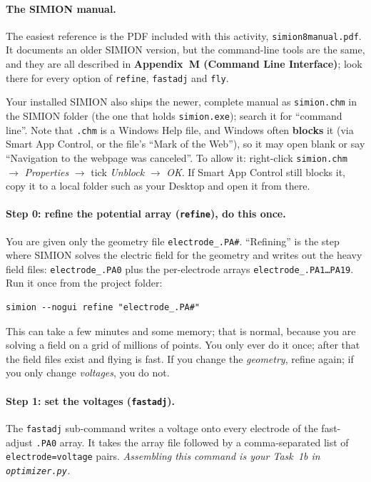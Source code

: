 \documentclass[11pt]{article}
\begin{document}
\paragraph{The SIMION manual.} The easiest reference is the PDF included with
this activity, \texttt{simion8manual.pdf}. It documents an older SIMION version,
but the command-line tools are the same, and they are all described in
\textbf{Appendix~M (Command Line Interface)}; look there for every option of
\texttt{refine}, \texttt{fastadj} and \texttt{fly}.

Your installed SIMION also ships the newer, complete manual as
\texttt{simion.chm} in the SIMION folder (the one that holds
\texttt{simion.exe}); search it for ``command line''. Note that \texttt{.chm} is
a Windows Help file, and Windows often \textbf{blocks} it (via Smart App
Control, or the file's ``Mark of the Web''), so it may open blank or say
``Navigation to the webpage was canceled''. To allow it: right-click
\texttt{simion.chm} $\to$ \emph{Properties} $\to$ tick \emph{Unblock} $\to$
\emph{OK}. If Smart App Control still blocks it, copy it to a local folder such
as your Desktop and open it from there.

\paragraph{Step 0: refine the potential array (\texttt{refine}), do this once.}
You are given only the geometry file \texttt{electrode\_.PA\#}. ``Refining'' is
the step where SIMION solves the electric field for the geometry and writes out
the heavy field files: \texttt{electrode\_.PA0} plus the per-electrode arrays
\texttt{electrode\_.PA1\dots PA19}. Run it once from the project folder:

\begin{lstlisting}[style=shell]
simion --nogui refine "electrode_.PA#"
\end{lstlisting}

\noindent This can take a few minutes and some memory; that is normal, because
you are solving a field on a grid of millions of points. You only ever do it
once; after that the field files exist and flying is fast. If you change the
\emph{geometry}, refine again; if you only change \emph{voltages}, you do not.

\paragraph{Step 1: set the voltages (\texttt{fastadj}).}
The \texttt{fastadj} sub-command writes a voltage onto every electrode of the
fast-adjust \texttt{.PA0} array. It takes the array file followed by a
comma-separated list of \texttt{electrode=voltage} pairs. \emph{Assembling this
command is your Task~1b in \texttt{optimizer.py}.}
\end{document}
